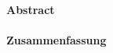 \cleardoublepage
\thispagestyle{plain}

\makeatletter
\begin{center}
	\large\textbf{\@title}\\
	\normalsize\@author
\end{center}
\makeatother

\paragraph{Abstract}


\begin{otherlanguage}{ngerman}

\paragraph{Zusammenfassung}

\end{otherlanguage}
